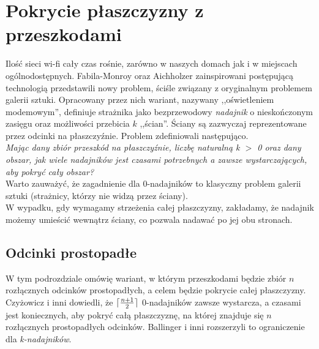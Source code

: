 \documentclass[brudnopis]{xmgr}
\DeclarePairedDelimiter\ceil{\lceil}{\rceil}
\theoremstyle{definition}
\begin{document}
\section{Pokrycie płaszczyzny z przeszkodami}
	Ilość sieci wi-fi cały czas rośnie, zarówno w naszych domach jak i w miejscach ogólnodostępnych. Fabila-Monroy oraz Aichholzer \cite{fabilamonroy} zainspirowani postępującą technologią przedstawili nowy problem, ściśle związany z oryginalnym problemem galerii sztuki. Opracowany przez nich wariant, nazywany ,,oświetleniem modemowym'', definiuje strażnika jako bezprzewodowy \emph{nadajnik} o nieskończonym zasięgu oraz możliwości przebicia $k$ ,,ścian''. Ściany są zazwyczaj reprezentowane przez odcinki na płaszczyźnie. Problem zdefiniowali następująco.
\\\indent \emph{Mając dany zbiór przeszkód na płaszczyźnie, liczbę naturalną k $>$ 0 oraz dany obszar, jak wiele nadajników jest czasami potrzebnych a zawsze wystarczających, aby pokryć cały obszar?}  
\\\indent Warto zauważyć, że zagadnienie dla 0-nadajników to klasyczny problem galerii sztuki (strażnicy, którzy nie widzą przez ściany).
\\\indent W wypadku, gdy wymagamy strzeżenia całej płaszczyzny, zakładamy, że nadajnik możemy umieścić wewnątrz ściany, co pozwala nadawać po jej obu stronach.
\subsection{Odcinki prostopadłe}
W tym podrozdziale omówię wariant, w którym przeszkodami będzie zbiór $n$ rozłącznych odcinków prostopadłych, a celem będzie pokrycie całej płaszczyzny. Czyżowicz i inni \cite{czyzowicz} dowiedli, że $\ceil{\frac{n+1}{2}}$ 0-nadajników zawsze wystarcza, a czasami jest koniecznych, aby pokryć całą płaszczyznę, na której znajduje się $n$ rozłącznych prostopadłych odcinków. Ballinger i inni \cite{knadajniki} rozszerzyli to ograniczenie dla \emph{k-nadajników}.
\end{document}
